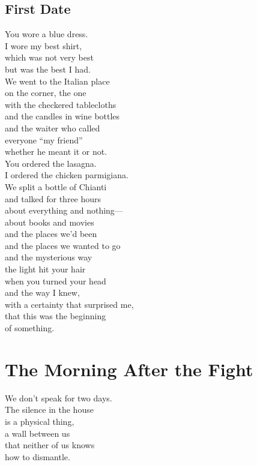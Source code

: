 \documentclass[
    language=english,
    doctype=poetry-collection,
    institution=none,
]{../../omnilatex}
\begin{document}
\begin{center}
\begin{minipage}{0.7\textwidth}
\section*{First Date}

You wore a blue dress.\\
I wore my best shirt,\\
which was not very best\\
but was the best I had.\\

We went to the Italian place\\
on the corner, the one\\
with the checkered tablecloths\\
and the candles in wine bottles\\
and the waiter who called\\
everyone ``my friend''\\
whether he meant it or not.\\

You ordered the lasagna.\\
I ordered the chicken parmigiana.\\
We split a bottle of Chianti\\
and talked for three hours\\
about everything and nothing---\\
about books and movies\\
and the places we'd been\\
and the places we wanted to go\\
and the mysterious way\\
the light hit your hair\\
when you turned your head\\
and the way I knew,\\
with a certainty that surprised me,\\
that this was the beginning\\
of something.
\end{minipage}
\end{center}

\section*{The Morning After the Fight}

We don't speak for two days.\\
The silence in the house\\
is a physical thing,\\
a wall between us\\
that neither of us knows\\
how to dismantle.\\
\end{document}
